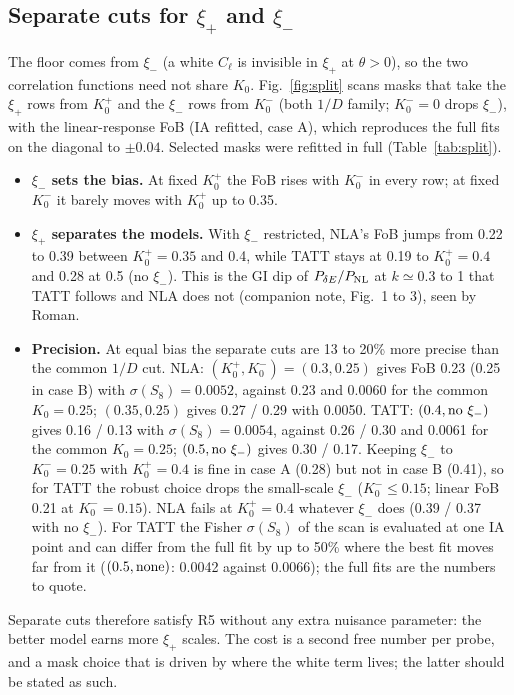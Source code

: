 \documentclass[11pt]{article}
\begin{document}
\subsection{Separate cuts for $\xi_+$ and $\xi_-$}\label{sec:split}
The floor comes from $\xi_-$ (a white $C_\ell$ is invisible in $\xi_+$ at
$\theta > 0$), so the two correlation functions need not share $K_0$.
Fig.~\ref{fig:split} scans masks that take the $\xi_+$ rows from $K_0^+$ and
the $\xi_-$ rows from $K_0^-$ (both $1/D$ family; $K_0^- = 0$ drops $\xi_-$),
with the linear-response FoB (IA refitted, case A), which reproduces the full
fits on the diagonal to $\pm0.04$. Selected masks were refitted in full
(Table~\ref{tab:split}).
\begin{itemize}[itemsep=2pt]
\item \textbf{$\xi_-$ sets the bias.} At fixed $K_0^+$ the FoB rises with
  $K_0^-$ in every row; at fixed $K_0^-$ it barely moves with $K_0^+$ up to
  0.35.
\item \textbf{$\xi_+$ separates the models.} With $\xi_-$ restricted, NLA's
  FoB jumps from 0.22 to 0.39 between $K_0^+ = 0.35$ and 0.4, while TATT
  stays at 0.19 to $K_0^+ = 0.4$ and 0.28 at 0.5 (no $\xi_-$). This is the
  GI dip of $P_{\delta E}/P_{\rm NL}$ at $k \simeq 0.3$ to 1 that TATT follows
  and NLA does not (companion note, Fig.~1 to 3), seen by Roman.
\item \textbf{Precision.} At equal bias the separate cuts are 13 to 20\%
more precise than the common $1/D$ cut. NLA: $(K_0^+, K_0^-) = (0.3, 0.25)$
gives FoB 0.23 (0.25 in case B) with $\sigma(S_8) = 0.0052$, against 0.23
and 0.0060 for the common $K_0 = 0.25$; $(0.35, 0.25)$ gives 0.27 / 0.29
with 0.0050. TATT: $(0.4, {\rm no}\ \xi_-)$ gives 0.16 / 0.13 with
$\sigma(S_8) = 0.0054$, against 0.26 / 0.30 and 0.0061 for the common
$K_0 = 0.25$; $(0.5, {\rm no}\ \xi_-)$ gives 0.30 / 0.17. Keeping
$\xi_-$ to $K_0^- = 0.25$ with $K_0^+ = 0.4$ is fine in case A (0.28) but
not in case B (0.41), so for TATT the robust choice drops the small-scale
$\xi_-$ ($K_0^- \le 0.15$; linear FoB 0.21 at $K_0^- = 0.15$). NLA fails at
$K_0^+ = 0.4$ whatever $\xi_-$ does (0.39 / 0.37 with no $\xi_-$). For TATT
the Fisher $\sigma(S_8)$ of the scan is evaluated at one IA point and can
differ from the full fit by up to 50\% where the best fit moves far from it
($(0.5, {\rm none})$: 0.0042 against 0.0066); the full fits are the numbers
to quote.
\end{itemize}
Separate cuts therefore satisfy R5 without any extra nuisance parameter: the
better model earns more $\xi_+$ scales. The cost is a second free number per
probe, and a mask choice that is driven by where the white term lives; the
latter should be stated as such.
\end{document}
